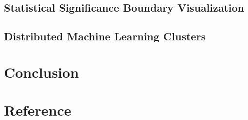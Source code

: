 \documentclass[11pt, oneside]{article}
\begin{document}
\subsection{Statistical Significance Boundary Visualization}
\subsection{Distributed Machine Learning Clusters}

\section{Conclusion}

\section{Reference}







\end{document}
